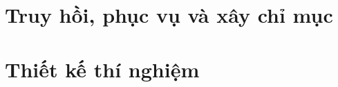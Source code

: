 \documentclass[11pt,a4paper,oneside]{report}
\begin{document}
\FloatBarrier
\section{Truy hồi, phục vụ và xây chỉ mục}















\clearpage
\section{Thiết kế thí nghiệm}
\end{document}
